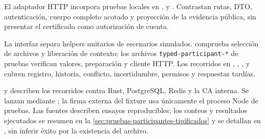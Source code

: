 {\raggedright El adaptador HTTP incorpora pruebas locales en ,  y . Contrastan rutas, DTO, autenticación, cuerpo completo acotado y proyección de la evidencia pública, sin presentar el certificado como autorización de cuenta.\par}

{\raggedright La interfaz separa helpers unitarios de escenarios simulados.  comprueba selección de archivos y liberación de contexto; los archivos \texttt{typed-participant-*} de pruebas verifican valores, preparación y cliente HTTP. Los recorridos en , , ,  y  cubren registro, historia, conflicto, incertidumbre, permisos y respuestas tardías.\par}

{\raggedright {} y  describen los recorridos contra Rust, PostgreSQL, Redis y la CA interna. Se lanzan mediante ; la firma externa del fixture usa únicamente el proceso Node de pruebas. Las fuentes describen ensayos reproducibles; los conteos y resultados ejecutados se resumen en la \cref{sec:pruebas-participantes-tipificados} y se detallan en , sin inferir éxito por la existencia del archivo.\par}
